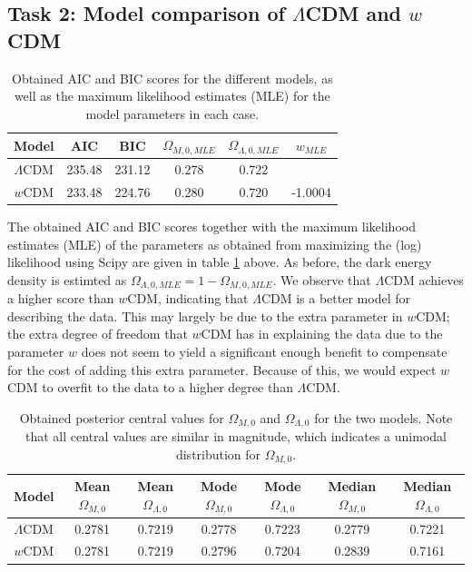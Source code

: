 \documentclass[11pt,a4paper]{article}
\begin{document}
\subsection[Task 2]{Task 2: Model comparison of $\Lambda$CDM and $w$CDM}

\begin{table}[H]
    \centering
    \caption{Obtained AIC and BIC scores for the different models, as well as the maximum likelihood estimates (MLE) for the model parameters in each case.}
    \begin{tabular}{||c | c c | c c c||} 
         \hline
         Model & AIC & BIC & $\Omega_{M,0, MLE}$ & $\Omega_{\Lambda, 0, MLE}$ & $w_{MLE}$\\ [0.5ex] 
         \hline\hline
         $\Lambda$CDM & 235.48 & 231.12 &   0.278 & 0.722 &  \\
         \hline
         $w$CDM & 233.48 & 224.76 & 0.280 &  0.720 & -1.0004 \\ [0.5ex]
         \hline
    \end{tabular}
    \label{tab:AIC_BIC}
\end{table}


The obtained AIC and BIC scores together with the maximum likelihood estimates (MLE) of the parameters as obtained from maximizing the (log) likelihood using Scipy are given in table \ref{tab:AIC_BIC} above. As before, the dark energy density is estimted as $\Omega_{\Lambda,0, MLE}=1-\Omega_{M,0, MLE}$. We observe that $\Lambda$CDM achieves a higher score than $w$CDM, indicating that $\Lambda$CDM is a better model for describing the data. This may largely be due to the extra parameter in $w$CDM; the extra degree of freedom that $w$CDM has in explaining the data due to the parameter $w$ does not seem to yield a significant enough benefit to compensate for the cost of adding this extra parameter. Because of this, we would expect $w$CDM to overfit to the data to a higher degree than $\Lambda$CDM. 

\begin{table}[H]
    \centering
    \caption{Obtained posterior central values for $\Omega_{M,0}$ and $\Omega_{\Lambda,0}$ for the two models. Note that all central values are similar in magnitude, which indicates a unimodal distribution for $\Omega_{M,0}$.}
    \begin{tabular}{||c | c c | c c | c c||} 
         \hline
         Model & Mean $\Omega_{M,0}$ & Mean $\Omega_{\Lambda,0}$ & Mode $\Omega_{M,0}$ & Mode $\Omega_{\Lambda,0}$ & Median $\Omega_{M,0}$ & Median $\Omega_{\Lambda,0}$ \\ [0.5ex] 
         \hline\hline
         $\Lambda$CDM & 0.2781 & 0.7219 & 0.2778 & 0.7223 & 0.2779 & 0.7221 \\
         \hline
         $w$CDM & 0.2781 & 0.7219 & 0.2796 & 0.7204 & 0.2839 & 0.7161 \\ [0.5ex] 
         \hline 
    \end{tabular}
    \label{tab:central_values}
\end{table}
\end{document}
